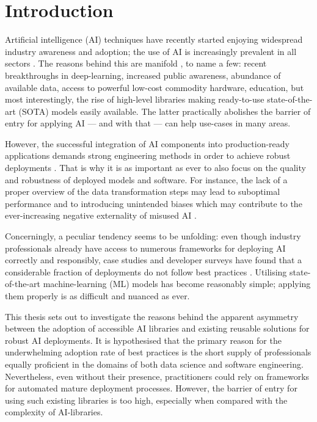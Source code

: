 \chapter{Introduction}

Artificial intelligence (AI) techniques have recently started enjoying widespread industry awareness and adoption; the use of AI is increasingly prevalent in all sectors \cite{wirtz2019artificial,bosch2021engineering}. The reasons behind this are manifold \cite{jordan2015machine}, to name a few: recent breakthroughs in deep-learning, increased public awareness, abundance of available data, access to powerful low-cost commodity hardware, education, but most interestingly, the rise of high-level libraries making ready-to-use state-of-the-art (SOTA) models easily available. The latter practically abolishes the barrier of entry for applying AI --- and with that --- can help use-cases in many areas. 

However, the successful integration of AI components into production-ready applications demands strong engineering methods in order to achieve robust deployments \cite{serban2020adoption}. That is why it is as important as ever to also focus on the quality and robustness of deployed models and software. For instance, the lack of a proper overview of the data transformation steps may lead to suboptimal performance and to introducing unintended biases which may contribute to the ever-increasing negative externality of misused AI \cite{o2016weapons}.

Concerningly, a peculiar tendency seems to be unfolding: even though industry professionals already have access to numerous frameworks for deploying AI correctly and responsibly, case studies and developer surveys have found that a considerable fraction of deployments do not follow best practices \cite{serban2020adoption,haakman2021ai,amershi2019software,de2019understanding,sculley2015hidden}. Utilising state-of-the-art machine-learning (ML) models has become reasonably simple; applying them properly is as difficult and nuanced as ever. 

This thesis sets out to investigate the reasons behind the apparent asymmetry between the adoption of accessible AI libraries and existing reusable solutions for robust AI deployments. It is hypothesised that the primary reason for the underwhelming adoption rate of best practices is the short supply of professionals equally proficient in the domains of both data science and software engineering. Nevertheless, even without their presence, practitioners could rely on frameworks for automated mature deployment processes. However, the barrier of entry for using such existing libraries is too high, especially when compared with the complexity of AI-libraries.

